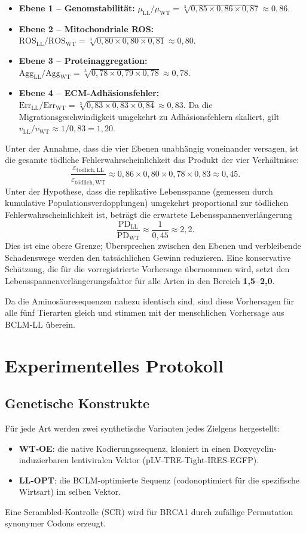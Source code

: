 \documentclass[12pt,a4paper]{article}
\begin{document}
	\begin{itemize}
		\item \textbf{Ebene 1 – Genomstabilität:} \(\mu_{\mathrm{LL}}/\mu_{\mathrm{WT}} = \sqrt[3]{0,85\times0,86\times0,87} \approx 0,86\).
		\item \textbf{Ebene 2 – Mitochondriale ROS:} \(\mathrm{ROS}_{\mathrm{LL}}/\mathrm{ROS}_{\mathrm{WT}} = \sqrt[3]{0,80\times0,80\times0,81} \approx 0,80\).
		\item \textbf{Ebene 3 – Proteinaggregation:} \(\mathrm{Agg}_{\mathrm{LL}}/\mathrm{Agg}_{\mathrm{WT}} = \sqrt[3]{0,78\times0,79\times0,78} \approx 0,78\).
		\item \textbf{Ebene 4 – ECM-Adhäsionsfehler:} \(\mathrm{Err}_{\mathrm{LL}}/\mathrm{Err}_{\mathrm{WT}} = \sqrt[3]{0,83\times0,83\times0,84} \approx 0,83\). Da die Migrationsgeschwindigkeit umgekehrt zu Adhäsionsfehlern skaliert, gilt \(v_{\mathrm{LL}}/v_{\mathrm{WT}} \approx 1/0,83 = 1,20\).
	\end{itemize}
	
	Unter der Annahme, dass die vier Ebenen unabhängig voneinander versagen, ist die gesamte tödliche Fehlerwahrscheinlichkeit das Produkt der vier Verhältnisse:
	\[
	\frac{\varepsilon_{\mathrm{tödlich,LL}}}{\varepsilon_{\mathrm{tödlich,WT}}} \approx 0,86 \times 0,80 \times 0,78 \times 0,83 \approx 0,45.
	\]
	Unter der Hypothese, dass die replikative Lebensspanne (gemessen durch kumulative Populationsverdopplungen) umgekehrt proportional zur tödlichen Fehlerwahrscheinlichkeit ist, beträgt die erwartete Lebensspannenverlängerung
	\[
	\frac{\mathrm{PD}_{\mathrm{LL}}}{\mathrm{PD}_{\mathrm{WT}}} \approx \frac{1}{0,45} \approx 2,2.
	\]
	Dies ist eine obere Grenze; Übersprechen zwischen den Ebenen und verbleibende Schadenswege werden den tatsächlichen Gewinn reduzieren. Eine konservative Schätzung, die für die vorregistrierte Vorhersage übernommen wird, setzt den Lebensspannenverlängerungsfaktor für alle Arten in den Bereich \textbf{1,5–2,0}.
	
	Da die Aminosäuresequenzen nahezu identisch sind, sind diese Vorhersagen für alle fünf Tierarten gleich und stimmen mit der menschlichen Vorhersage aus BCLM‑LL überein.
	
	\section{Experimentelles Protokoll}
	\label{sec:protocol}
	
	\subsection{Genetische Konstrukte}
	Für jede Art werden zwei synthetische Varianten jedes Zielgens hergestellt:
	\begin{itemize}
		\item \textbf{WT‑OE}: die native Kodierungssequenz, kloniert in einen Doxycyclin-induzierbaren lentiviralen Vektor (pLV‑TRE‑Tight‑IRES‑EGFP).
		\item \textbf{LL‑OPT}: die BCLM-optimierte Sequenz (codonoptimiert für die spezifische Wirtsart) im selben Vektor.
	\end{itemize}
	Eine Scrambled-Kontrolle (SCR) wird für BRCA1 durch zufällige Permutation synonymer Codons erzeugt.
	
\end{document}
